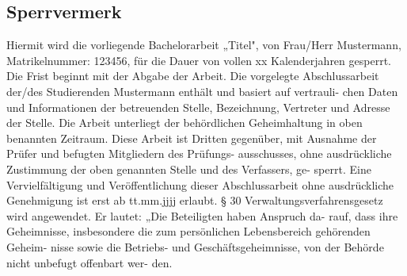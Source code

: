 \subsection*{Sperrvermerk}

Hiermit wird die vorliegende Bachelorarbeit „Titel", von Frau/Herr Mustermann, Matrikelnummer:
123456, für die Dauer von vollen xx Kalenderjahren gesperrt. Die Frist beginnt mit der Abgabe der
Arbeit.
Die vorgelegte Abschlussarbeit der/des Studierenden Mustermann enthält und basiert auf vertrauli-
chen Daten und Informationen der betreuenden Stelle, Bezeichnung, Vertreter und Adresse der
Stelle.
Die Arbeit unterliegt der behördlichen Geheimhaltung in oben benannten Zeitraum.
Diese Arbeit ist Dritten gegenüber, mit Ausnahme der Prüfer und befugten Mitgliedern des Prüfungs-
ausschusses, ohne ausdrückliche Zustimmung der oben genannten Stelle und des Verfassers, ge-
sperrt.
Eine Vervielfältigung und Veröffentlichung dieser Abschlussarbeit ohne ausdrückliche Genehmigung
ist erst ab tt.mm.jjjj erlaubt.
§ 30 Verwaltungsverfahrensgesetz wird angewendet. Er lautet: „Die Beteiligten haben Anspruch da-
rauf, dass ihre Geheimnisse, insbesondere die zum persönlichen Lebensbereich gehörenden Geheim-
nisse sowie die Betriebs- und Geschäftsgeheimnisse, von der Behörde nicht unbefugt offenbart wer-
den.
\vspace*{20pt}